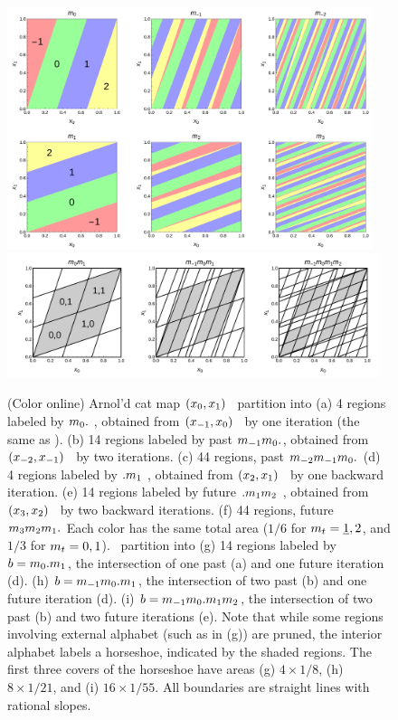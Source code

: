 \documentclass[12pt]{iopart}
\begin{document}
\begin{figure}
	\centering
	\includegraphics[width=0.95\textwidth]{SingleCat1Symbol}
\\
	\includegraphics[width=0.97\textwidth]{SingleCatMultiSymbol}
	\caption{\label{fig:SingleCatPartit}
(Color online)
Arnol'd cat map $(x_{0},x_{1})$  \statesp\ partition into
(a) 4 regions labeled by ${m_{0}}.$ , obtained from
$(x_{-1},x_{0})$ \statesp\ by one iteration (the same as
).
(b) 14 regions labeled by past {\brick} ${m_{-1}}{m_{0}}.$, obtained from
$(x_{-2},x_{-1})$ \statesp\ by two iterations.
(c) 44 regions, past {\brick} ${m_{-2}}{m_{-1}}{m_{0}}.$
(d) 4 regions labeled by $.{m_{1}}$ , obtained from
$(x_{2},x_{1})$ \statesp\ by one backward iteration.
(e) 14 regions labeled by future {\brick} $.{m_{1}}{m_{2}}$ , obtained from
$(x_{3},x_{2})$ \statesp\ by two backward iterations.
(f) 44 regions, future {\brick} ${m_{3}}{m_{2}}{m_{1}}.$
Each color has the same total area ($1/6$ for ${m_{t}} = \underline{1},
2$, and $1/3$ for ${m_{t}} = 0, 1$).
\Statesp\ partition into
(g) 14 regions labeled by {\brick} $b = {m_{0}}.{m_{1}}$, the
intersection of one past (a) and
one future iteration (d).
(h) {\brick} $b = {m_{-1}}{m_{0}}.{m_{1}}$, the intersection of two
past (b) and one future iteration (d).
(i) {\brick} $b = {m_{-1}}{m_{0}}.{m_{1}}{m_{2}}$, the intersection
of two past (b) and two future iterations (e).
Note that while some regions involving external alphabet (such as
 in (g)) are pruned, the interior alphabet labels a horseshoe,
indicated by the shaded regions.
The first three covers of the horseshoe have areas (g) $4 \times
1/8$, (h) $8 \times 1/21$, and (i) $16 \times 1/55$.
All boundaries are straight lines with rational slopes.
	}
\end{figure}
\end{document}
